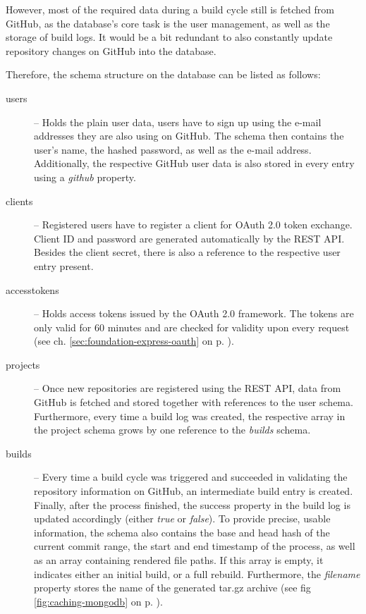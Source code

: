 However, most of the required data during a build cycle still is fetched from GitHub, as the database's core task is the user management, as well as the storage of build logs. It would be a bit redundant to also constantly update repository changes on GitHub into the database.

Therefore, the schema structure on the database can be listed as follows:

\begin{description}
  \item[users] -- Holds the plain user data, users have to sign up using the e-mail addresses they are also using on GitHub. The schema then contains the user's name, the hashed password, as well as the e-mail address. Additionally, the respective GitHub user data is also stored in every entry using a \emph{github} property.
  \item[clients] -- Registered users have to register a client for OAuth 2.0 token exchange. Client ID and password are generated automatically by the REST API. Besides the client secret, there is also a reference to the respective user entry present.
  \item[accesstokens] -- Holds access tokens issued by the OAuth 2.0 framework. The tokens are only valid for 60 minutes and are checked for validity upon every request (see ch. \ref{sec:foundation-express-oauth} on p. \pageref{sec:foundation-express-oauth}).
  \item[projects] -- Once new repositories are registered using the REST API, data from GitHub is fetched and stored together with references to the user schema. Furthermore, every time a build log was created, the respective array in the project schema grows by one reference to the \emph{builds} schema.
  \item[builds] -- Every time a build cycle was triggered and succeeded in validating the repository information on GitHub, an intermediate build entry is created. Finally, after the process finished, the success property in the build log is updated accordingly (either \emph{true} or \emph{false}). To provide precise, usable information, the schema also contains the base and head hash of the current commit range, the start and end timestamp of the process, as well as an array containing rendered file paths. If this array is empty, it indicates either an initial build, or a full rebuild. Furthermore, the \emph{filename} property stores the name of the generated tar.gz archive (see fig \ref{fig:caching-mongodb} on p. \pageref{fig:caching-mongodb}).
\end{description}
